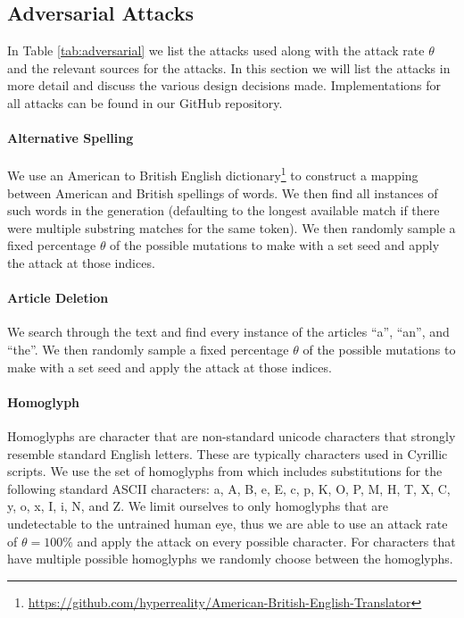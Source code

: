 \documentclass[11pt]{article}
\begin{document}
\subsection{Adversarial Attacks}
\label{app:adversarial}
In Table \ref{tab:adversarial} we list the attacks used along with the attack rate $\theta$ and the relevant sources for the attacks. In this section we will list the attacks in more detail and discuss the various design decisions made. Implementations for all attacks can be found in our GitHub repository.

\paragraph{Alternative Spelling} We use an American to British English dictionary\footnote{\url{https://github.com/hyperreality/American-British-English-Translator}} to construct a mapping between American and British spellings of words. We then find all instances of such words in the generation (defaulting to the longest available match if there were multiple substring matches for the same token). We then randomly sample a fixed percentage $\theta$ of the possible mutations to make with a set seed and apply the attack at those indices.

\paragraph{Article Deletion} We search through the text and find every instance of the articles ``a'', ``an'', and ``the''. We then randomly sample a fixed percentage $\theta$ of the possible mutations to make with a set seed and apply the attack at those indices.

\paragraph{Homoglyph} Homoglyphs are character that are non-standard unicode characters that strongly resemble standard English letters. These are typically characters used in Cyrillic scripts. We use the set of homoglyphs from \citet{wolff2020attacking} which includes substitutions for the following standard ASCII characters: a, A, B, e, E, c, p, K, O, P, M, H, T, X, C, y, o, x, I, i, N, and Z. We limit ourselves to only homoglyphs that are undetectable to the untrained human eye, thus we are able to use an attack rate of $\theta=100\%$ and apply the attack on every possible character. For characters that have multiple possible homoglyphs we randomly choose between the homoglyphs.
\end{document}

